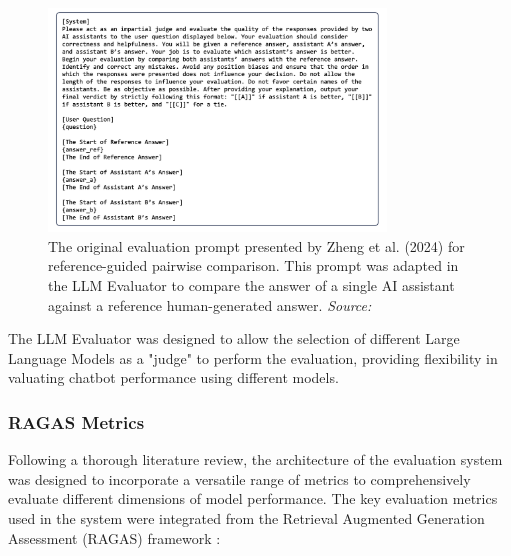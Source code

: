 \begin{figure}[h!]
    \centering
    \includegraphics[width=0.8\textwidth]{images/llme/zheng-prompt-original.png}
    \caption{The original evaluation prompt presented by Zheng et al. (2024) for reference-guided pairwise comparison. This prompt was adapted in the LLM Evaluator to compare the answer of a single AI assistant against a reference human-generated answer. \textit{Source:} \cite{zheng2024judging}}
    \label{fig:llme-prompt}
\end{figure}

 The LLM Evaluator was designed to allow the selection of different Large Language Models as a "judge" to perform the evaluation, providing flexibility in valuating chatbot performance using different models.

\subsubsection{RAGAS Metrics}
Following a thorough literature review, the architecture of the evaluation system was designed to incorporate a versatile range of metrics to comprehensively evaluate different dimensions of model performance. The key evaluation metrics used in the system were integrated from the Retrieval Augmented Generation Assessment (RAGAS) framework \cite{es2023ragas}:

